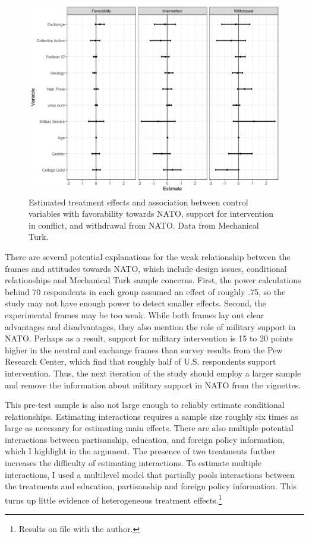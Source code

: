 \documentclass[12pt]{article}
\begin{document}
\begin{figure}
\includegraphics[width = .95\textwidth]{../figures/mturk-res-both.png} 
\caption{Estimated treatment effects and association between control variables with favorability towards NATO, support for intervention in conflict, and withdrawal from NATO. Data from Mechanical Turk.}
\label{fig:mturk-res-both}
\end{figure}


There are several potential explanations for the weak relationship between the frames and attitudes towards NATO, which include design issues, conditional relationships and Mechanical Turk sample concerns.  
First, the power calculations behind 70 respondents in each group assumed an effect of roughly .75, so the study may not have enough power to detect smaller effects.
Second, the experimental frames may be too weak. 
While both frames lay out clear advantages and disadvantages, they also mention the role of military support in NATO. 
Perhaps as a result, support for military intervention is 15 to 20 points higher in the neutral and exchange frames than survey results from the Pew Research Center, which find that roughly half of U.S. respondents support intervention. 
Thus, the next iteration of the study should employ a larger sample and remove the information about military support in NATO from the vignettes. 


This pre-test sample is also not large enough to reliably estimate conditional relationships. 
Estimating interactions requires a sample size roughly six times as large as necessary for estimating main effects. 
There are also multiple potential interactions between partisanship, education, and foreign policy information, which I highlight in the argument. 
The presence of two treatments further increases the difficulty of estimating interactions. 
To estimate multiple interactions, I used a multilevel model that partially pools interactions between the treatments and education, partisanship and foreign policy information.
This turns up little evidence of heterogeneous treatment effects.\footnote{Results on file with the author.}
\end{document}
